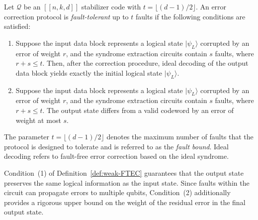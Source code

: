 \documentclass[acmsmall,screen,review,anonymous,nonacm]{acmart}
\begin{document}
\begin{definition}
\label{def:weak-FTEC}
Let $\mathcal{Q}$ be an $[[n,k,d]]$ stabilizer code with $t=\lfloor (d-1)/2\rfloor$. An error correction protocol is \emph{fault-tolerant} up to $t$ faults if the following conditions are satisfied:
\begin{enumerate}
    \item Suppose the input data block represents a logical state $|\psi_L\rangle$ corrupted by an error of weight $r$, and the syndrome extraction circuits contain $s$ faults, where $r+s\le t$. Then, after the correction procedure, ideal decoding of the output data block yields exactly the initial logical state $|\psi_L\rangle$.
    \item Suppose the input data block represents a logical state $|\psi_L\rangle$ corrupted by an error of weight $r$, and the syndrome extraction circuits contain $s$ faults, where $r+s\le t$. The output state differs from a valid codeword by an error of weight at most $s$.
\end{enumerate}
\end{definition}

The parameter
$t=\lfloor (d-1)/2\rfloor$ denotes the maximum number of faults that the protocol is designed to tolerate and is referred to as the \emph{fault bound}. Ideal decoding refers to fault-free error correction based on the ideal syndrome.

Condition~(1) of Definition~\ref{def:weak-FTEC} guarantees that the output state preserves the same logical information as the input state. Since faults within the circuit can propagate errors to multiple qubits, Condition~(2) additionally provides a rigorous upper bound on the weight of the residual error in the final output state.



\end{document}
